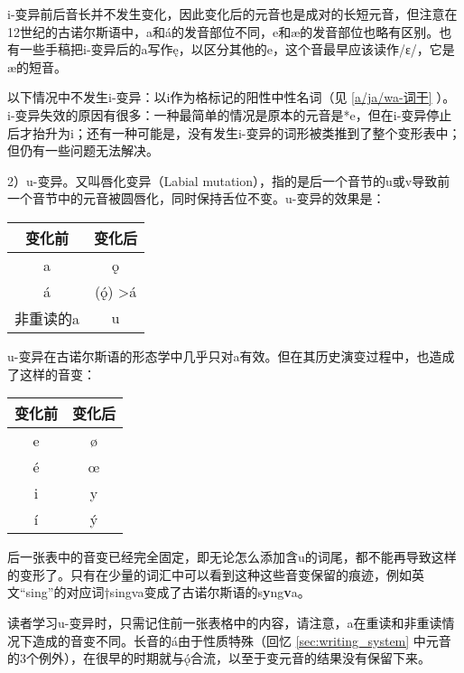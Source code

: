 i-变异前后音长并不发生变化，因此变化后的元音也是成对的长短元音，但注意在12世纪的古诺尔斯语中，a和á的发音部位不同，e和æ的发音部位也略有区别。也有一些手稿把i-变异后的a写作ę，以区分其他的e，这个音最早应该读作/ɛ/，它是æ的短音。

以下情况中不发生i-变异：以i作为格标记的阳性中性名词（见 \ref{a/ja/wa-词干} ）。i-变异失效的原因有很多：一种最简单的情况是原本的元音是*e，但在i-变异停止后才抬升为i；还有一种可能是，没有发生i-变异的词形被类推到了整个变形表中；但仍有一些问题无法解决。

2）u-变异。又叫唇化变异（Labial mutation），指的是后一个音节的u或v导致前一个音节中的元音被圆唇化，同时保持舌位不变。u-变异的效果是：

\begin{table}[H]
    \centering
    \begin{tabular}{cc}
    \hline
    \textbf{变化前}   & \textbf{变化后}                 \\ \hline
    a     & ǫ                   \\
    á     & (ǫ́) \textgreater á \\
    非重读的a & u                   \\ \hline
    \end{tabular}
\end{table}

u-变异在古诺尔斯语的形态学中几乎只对a有效。但在其历史演变过程中，也造成了这样的音变：

\begin{table}[H]
    \centering
    \begin{tabular}{cc}
    \hline
    \textbf{变化前} & \textbf{变化后} \\ \hline
    e   & ø   \\
    é   & œ   \\
    i   & y   \\
    í   & ý   \\ \hline
    \end{tabular}
\end{table}

后一张表中的音变已经完全固定，即无论怎么添加含u的词尾，都不能再导致这样的变形了。只有在少量的词汇中可以看到这种这些音变保留的痕迹，例如英文``sing''的对应词†singva变成了古诺尔斯语的s\textbf{y}ng\textbf{v}a。

读者学习u-变异时，只需记住前一张表格中的内容，请注意，a在重读和非重读情况下造成的音变不同。长音的á由于性质特殊（回忆 \ref{sec:writing_system} 中元音的3个例外），在很早的时期就与ǫ́合流，以至于变元音的结果没有保留下来。


